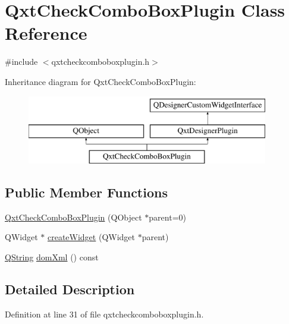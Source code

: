 \hypertarget{class_qxt_check_combo_box_plugin}{\section{Qxt\-Check\-Combo\-Box\-Plugin Class Reference}
\label{class_qxt_check_combo_box_plugin}
}


{\ttfamily \#include $<$qxtcheckcomboboxplugin.\-h$>$}

Inheritance diagram for Qxt\-Check\-Combo\-Box\-Plugin\-:\begin{figure}[H]
\begin{center}
\leavevmode
\includegraphics[height=3.000000cm]{class_qxt_check_combo_box_plugin}
\end{center}
\end{figure}
\subsection*{Public Member Functions}
\begin{DoxyCompactItemize}
\item 
\hyperlink{class_qxt_check_combo_box_plugin_a340e590e248ef5d2392c88bffe9d7099}{Qxt\-Check\-Combo\-Box\-Plugin} (Q\-Object $\ast$parent=0)
\item 
Q\-Widget $\ast$ \hyperlink{class_qxt_check_combo_box_plugin_aaaa2018fb31c3213f09d9f09b5d90cd7}{create\-Widget} (Q\-Widget $\ast$parent)
\item 
\hyperlink{group___u_a_v_objects_plugin_gab9d252f49c333c94a72f97ce3105a32d}{Q\-String} \hyperlink{class_qxt_check_combo_box_plugin_a2ccaa08a9ac97654e8d140ea4683a10c}{dom\-Xml} () const 
\end{DoxyCompactItemize}


\subsection{Detailed Description}


Definition at line 31 of file qxtcheckcomboboxplugin.\-h.



